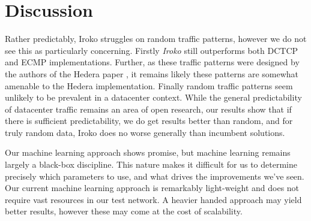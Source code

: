 \section{Discussion}
\label{sec:discussion}

Rather predictably, Iroko struggles on random traffic patterns, however we
do not see this as particularly concerning. Firstly \textit{Iroko} still outperforms
both DCTCP and ECMP implementations. Further, as these traffic patterns
were designed by the authors of the Hedera paper \cite{hedera}, it remains
likely these patterns are somewhat amenable to the Hedera implementation.
Finally random traffic patterns seem unlikely to be prevalent in a
datacenter context. While the general predictability of datacenter
traffic remains an area of open research, our results show that
if there is sufficient predictability, we do get results better than
random, and for truly random data, Iroko does no worse generally than
incumbent solutions. 

Our machine learning approach shows promise, but machine learning remains
largely a black-box discipline. This nature makes it difficult for us
to determine precisely which parameters to use, and what drives
the improvements we've seen. Our current machine learning approach
is remarkably light-weight and does not require vast resources
in our test network. A heavier handed approach may yield better
results, however these may come at the cost of scalability. 
